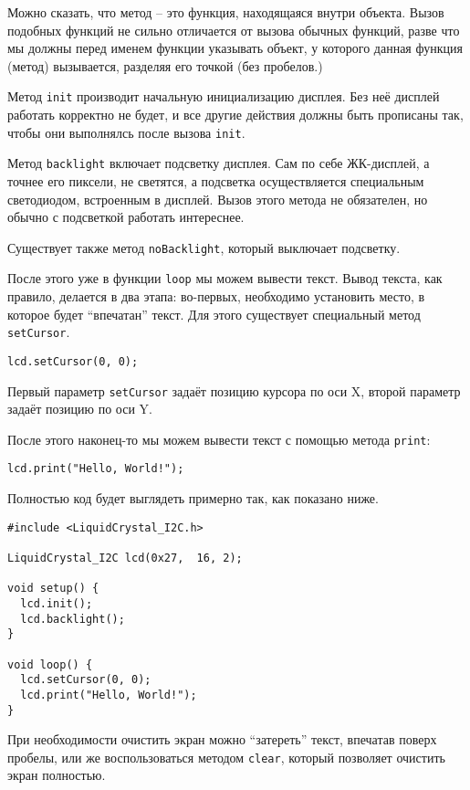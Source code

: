 \documentclass[../sparc.tex]{subfiles}
\begin{document}
Можно сказать, что \gls{метод} -- это функция, находящаяся внутри объекта.
Вызов подобных функций не сильно отличается от вызова обычных функций, разве что
мы должны перед именем функции указывать объект, у которого данная функция
(метод) вызывается, разделяя его точкой (без пробелов.)

Метод \texttt{init} производит начальную инициализацию дисплея.  Без неё дисплей
работать корректно не будет, и все другие действия должны быть прописаны так,
чтобы они выполнялсь после вызова \texttt{init}.

Метод \texttt{backlight} включает подсветку дисплея.  Сам по себе ЖК-дисплей, а
точнее его пиксели, не светятся, а подсветка осуществляется специальным
светодиодом, встроенным в дисплей.  Вызов этого метода не обязателен, но обычно
с подсветкой работать интереснее.

Существует также метод \texttt{noBacklight}, который выключает подсветку.

После этого уже в функции \texttt{loop} мы можем вывести текст.  Вывод текста,
как правило, делается в два этапа: во-первых, необходимо установить место, в
которое будет ``впечатан'' текст.  Для этого существует специальный метод
\texttt{setCursor}.

\begin{verbatim}
lcd.setCursor(0, 0);
\end{verbatim}

Первый параметр \texttt{setCursor} задаёт позицию курсора по оси X, второй
параметр задаёт позицию по оси Y.

После этого наконец-то мы можем вывести текст с помощью метода \texttt{print}:

\begin{verbatim}
lcd.print("Hello, World!");
\end{verbatim}

Полностью код будет выглядеть примерно так, как показано ниже.

\begin{verbatim}
#include <LiquidCrystal_I2C.h>

LiquidCrystal_I2C lcd(0x27,  16, 2);

void setup() {
  lcd.init();
  lcd.backlight();
}

void loop() {
  lcd.setCursor(0, 0);
  lcd.print("Hello, World!");
}
\end{verbatim}

При необходимости очистить экран можно ``затереть'' текст, впечатав поверх
пробелы, или же воспользоваться методом \texttt{clear}, который позволяет
очистить экран полностью.
\end{document}
